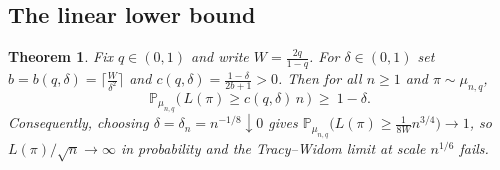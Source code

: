 \documentclass[12pt]{article}
\newtheorem{theorem}{Theorem}
\theoremstyle{definition}
\newcommand{\PP}{\mathbb{P}}
\begin{document}
\subsection{The linear lower bound}
\begin{theorem}\label{thm:C}
Fix $q\in(0,1)$ and write $W=\tfrac{2q}{1-q}$. For $\delta\in(0,1)$ set
$b=b(q,\delta)=\big\lceil \tfrac{W}{\delta^{2}}\big\rceil$ and
$c(q,\delta)=\tfrac{1-\delta}{2b+1}>0$. Then for all $n\ge1$ and $\pi\sim\mu_{n,q}$,
\[
\PP_{\mu_{n,q}}\big(\,L(\pi)\ge c(q,\delta)\,n\,\big)\ \ge\ 1-\delta .
\]
Consequently, choosing $\delta=\delta_n=n^{-1/8}\downarrow0$ gives
$\PP_{\mu_{n,q}}\big(L(\pi)\ge \tfrac{1}{8W}n^{3/4}\big)\to1$, so $L(\pi)/\sqrt n\to\infty$
in probability and the Tracy--Widom limit at scale $n^{1/6}$ fails.
\end{theorem}
\end{document}
